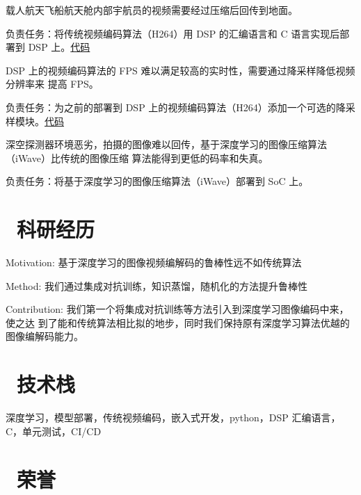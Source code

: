 \documentclass[../main]{subfiles}
\begin{document}
%
载人航天飞船航天舱内部宇航员的视频需要经过压缩后回传到地面。

负责任务：将传统视频编码算法（H264）用 DSP 的汇编语言和 C 语言实现后部署到 DSP 上。\href{https://github.com/Freed-Wu/x264}{代码}

%
DSP 上的视频编码算法的 FPS 难以满足较高的实时性，需要通过降采样降低视频分辨率来
提高 FPS。

负责任务：为之前的部署到 DSP 上的视频编码算法（H264）添加一个可选的降采样模块。\href{https://github.com/Freed-Wu/x264-dsp}{代码}

%
深空探测器环境恶劣，拍摄的图像难以回传，基于深度学习的图像压缩算法（iWave）比传统的图像压缩
算法能得到更低的码率和失真。

负责任务：将基于深度学习的图像压缩算法（iWave）部署到 SoC 上。

\section{\faUsers\ 科研经历}%
Motivation: 基于深度学习的图像视频编解码的鲁棒性远不如传统算法

Method: 我们通过集成对抗训练，知识蒸馏，随机化的方法提升鲁棒性

Contribution: 我们第一个将集成对抗训练等方法引入到深度学习图像编码中来，使之达
到了能和传统算法相比拟的地步，同时我们保持原有深度学习算法优越的图像编解码能力。

\section{\faCogs\ 技术栈}%

深度学习，模型部署，传统视频编码，嵌入式开发，python，DSP 汇编语言，C，单元测试，CI/CD

\section{\faHeart\ 荣誉}%

\end{document}

